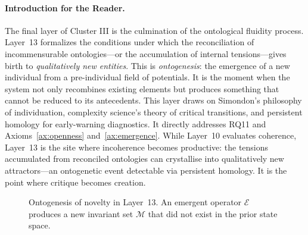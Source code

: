 \paragraph{Introduction for the Reader.}
The final layer of Cluster III is the culmination of the ontological fluidity process. Layer~13 formalizes the conditions under which the reconciliation of incommensurable ontologies—or the accumulation of internal tensions—gives birth to \emph{qualitatively new entities}. This is \emph{ontogenesis}: the emergence of a new individual from a pre-individual field of potentials. It is the moment when the system not only recombines existing elements but produces something that cannot be reduced to its antecedents. This layer draws on Simondon's philosophy of individuation, complexity science's theory of critical transitions, and persistent homology for early-warning diagnostics. It directly addresses RQ11 and Axioms~\ref{ax:openness} and~\ref{ax:emergence}.
While Layer~10 evaluates coherence, Layer~13 is the site where incoherence becomes productive: the tensions accumulated from reconciled ontologies can crystallise into qualitatively new attractors—an ontogenetic event detectable via persistent homology. It is the point where critique becomes creation.

\begin{figure}[htbp]
    \centering
    \caption{Ontogenesis of novelty in Layer~13. An emergent operator $\mathcal{E}$ produces a new invariant set $\mathcal{M}$ that did not exist in the prior state space.}
    \label{fig:layer13}
\end{figure}

